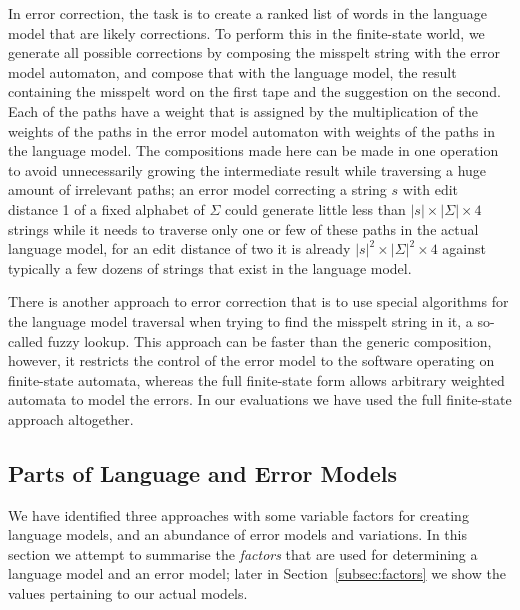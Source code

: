 \documentclass[a4paper,12pt]{article}
\begin{document}
In error correction, the task is to create a ranked list of words in the
language model that are likely corrections. To perform this in the finite-state
world, we generate all possible corrections by composing the misspelt string
with the error model automaton, and compose that with the language model, the
result containing the misspelt word on the first tape and the suggestion on the
second. Each of the paths have a weight that is assigned by the multiplication
of the weights of the paths in the error model automaton with weights of the
paths in the language model. The compositions made here can be made in one
operation~\cite[]{hfst/2012/cla} to avoid unnecessarily growing the
intermediate result while traversing a huge amount of irrelevant paths; an
error model correcting a string $s$ with edit distance 1 of a fixed alphabet of
$\Sigma$ could generate little less than $|s| \times |\Sigma| \times 4$ strings
while it needs to traverse only one or few of these paths in the actual
language model, for an edit distance of two it is already $|s|^2 \times
|\Sigma|^2 \times 4$ against typically a few dozens of strings that exist in
the language model.

There is another approach to error correction that is to use special algorithms
for the language model traversal when trying to find the misspelt string in it,
a so-called fuzzy lookup. This approach can be faster than the generic
composition, however, it restricts the control of the error model to the
software operating on finite-state automata, whereas the full finite-state form
allows arbitrary weighted automata to model the errors. In our evaluations we
have used the full finite-state approach altogether.

\subsection{Parts of Language and Error Models}
\label{subsec:summary}

We have identified three approaches with some variable factors for creating
language models, and an abundance of error models and variations. In this
section we attempt to summarise the \emph{factors} that are used for
determining a language model and an error model; later in
Section~\ref{subsec:factors} we show the values pertaining to our actual
models.
\end{document}

